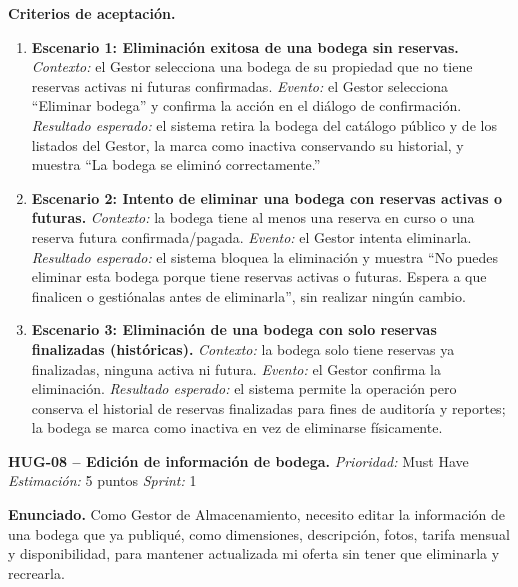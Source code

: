 \textbf{Criterios de aceptación.}
\begin{enumerate}
\item \textbf{Escenario 1: Eliminación exitosa de una bodega sin reservas.} \textit{Contexto:} el Gestor selecciona una bodega de su propiedad que no tiene reservas activas ni futuras confirmadas. \textit{Evento:} el Gestor selecciona ``Eliminar bodega'' y confirma la acción en el diálogo de confirmación. \textit{Resultado esperado:} el sistema retira la bodega del catálogo público y de los listados del Gestor, la marca como inactiva conservando su historial, y muestra ``La bodega se eliminó correctamente.''
\item \textbf{Escenario 2: Intento de eliminar una bodega con reservas activas o futuras.} \textit{Contexto:} la bodega tiene al menos una reserva en curso o una reserva futura confirmada/pagada. \textit{Evento:} el Gestor intenta eliminarla. \textit{Resultado esperado:} el sistema bloquea la eliminación y muestra ``No puedes eliminar esta bodega porque tiene reservas activas o futuras. Espera a que finalicen o gestiónalas antes de eliminarla'', sin realizar ningún cambio.
\item \textbf{Escenario 3: Eliminación de una bodega con solo reservas finalizadas (históricas).} \textit{Contexto:} la bodega solo tiene reservas ya finalizadas, ninguna activa ni futura. \textit{Evento:} el Gestor confirma la eliminación. \textit{Resultado esperado:} el sistema permite la operación pero conserva el historial de reservas finalizadas para fines de auditoría y reportes; la bodega se marca como inactiva en vez de eliminarse físicamente.
\end{enumerate}

\textbf{HUG-08 -- Edición de información de bodega.} \label{req:HUG-08}
\textit{Prioridad:} Must Have \quad \textit{Estimación:} 5 puntos \quad \textit{Sprint:} 1

\textbf{Enunciado.} Como Gestor de Almacenamiento, necesito editar la información de una bodega que ya publiqué, como dimensiones, descripción, fotos, tarifa mensual y disponibilidad, para mantener actualizada mi oferta sin tener que eliminarla y recrearla.

